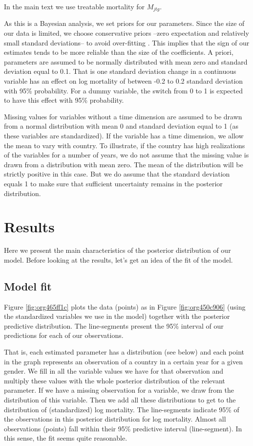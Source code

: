 \documentclass[12pt,english,a4paper]{article}
\begin{document}
In the main text we use treatable mortality for \(M_{jtg}\).

As this is a Bayesian analysis, we set priors for our parameters. Since the size of our data is limited, we choose conservative priors --zero expectation and relatively small standard deviations-- to avoid over-fitting  \citep{mcelreath}. This implies that the sign of our estimates tends to be more reliable than the size of the coefficients. A priori, parameters are assumed to be normally distributed with mean zero and standard deviation equal to 0.1. That is one standard deviation change in a continuous variable has an effect on log mortality of between -0.2 to 0.2 standard deviation with 95\% probability. For a dummy variable, the switch from 0 to 1 is expected to have this effect with 95\% probability.

Missing values for variables without a time dimension are assumed to be drawn from a normal distribution with mean 0 and standard deviation equal to 1 (as these variables are standardized). If the variable has a time dimension, we allow the mean to vary with country. To illustrate, if the country has high realizations of the variables for a number of years, we do not assume that the missing value is drawn from a distribution with mean zero. The mean of the distribution will be strictly positive in this case. But we do assume that the standard deviation equals 1 to make sure that sufficient uncertainty remains in the posterior distribution.


\section{Results}
\label{sec:org76121e5}

Here we present the main characteristics of the posterior distribution of our model. Before looking at the results, let's get an idea of the fit of the model.

\subsection{Model fit}
\label{sec:orge2eb4ae}

Figure \ref{fig:org465ff1c} plots the data (points) as in Figure \ref{fig:org450c906} (using the standardized variables we use in the model) together with the posterior predictive distribution. The line-segments present the 95\% interval of our predictions for each of our observations.

That is, each estimated parameter has a distribution (see below) and each point in the graph represents an observation of a country in a certain year for a given gender. We fill in all the variable values we have for that observation and multiply these values with the whole posterior distribution of the relevant parameter. If we have a missing observation for a variable, we draw from the distribution of this variable. Then we add all these distributions to get to the distribution of (standardized) log mortality. The line-segments indicate 95\% of the observations in this posterior distribution for log mortality. Almost all observations (points) fall within their 95\% predictive interval (line-segment). In this sense, the fit seems quite reasonable.
\end{document}
